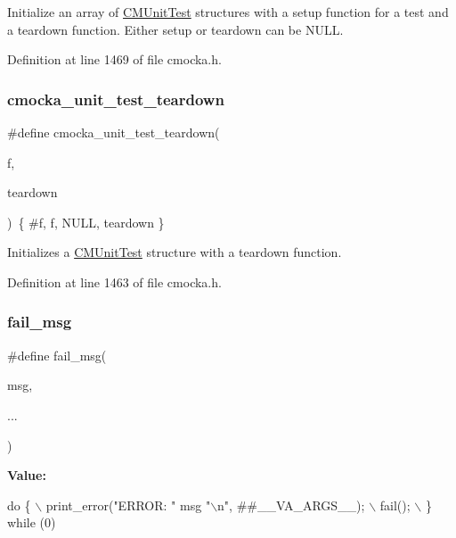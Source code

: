Initialize an array of \hyperlink{structCMUnitTest}{C\+M\+Unit\+Test} structures with a setup function for a test and a teardown function. Either setup or teardown can be N\+U\+LL. 

Definition at line 1469 of file cmocka.\+h.

\mbox{\label{group__cmocka__exec_ga9b0d5ed78ddeba6d9aaa9a692cda426b}} 
\subsubsection{\texorpdfstring{cmocka\+\_\+unit\+\_\+test\+\_\+teardown}{cmocka\_unit\_test\_teardown}}
{\footnotesize\ttfamily \#define cmocka\+\_\+unit\+\_\+test\+\_\+teardown(\begin{DoxyParamCaption}\item[{}]{f,  }\item[{}]{teardown }\end{DoxyParamCaption})~\{ \#f, f, N\+U\+LL, teardown \}}

Initializes a \hyperlink{structCMUnitTest}{C\+M\+Unit\+Test} structure with a teardown function. 

Definition at line 1463 of file cmocka.\+h.

\mbox{\label{group__cmocka__exec_ga6da2355538bde0b4d5fe89b1fbc95899}} 
\subsubsection{\texorpdfstring{fail\+\_\+msg}{fail\_msg}}
{\footnotesize\ttfamily \#define fail\+\_\+msg(\begin{DoxyParamCaption}\item[{}]{msg,  }\item[{}]{... }\end{DoxyParamCaption})}

{\bfseries Value\+:}
\begin{DoxyCode}
\textcolor{keywordflow}{do} \{ \(\backslash\)
    print\_error(\textcolor{stringliteral}{"ERROR: "} msg \textcolor{stringliteral}{"\(\backslash\)n"}, ##\_\_VA\_ARGS\_\_); \(\backslash\)
    fail(); \(\backslash\)
\} \textcolor{keywordflow}{while} (0)
\end{DoxyCode}


